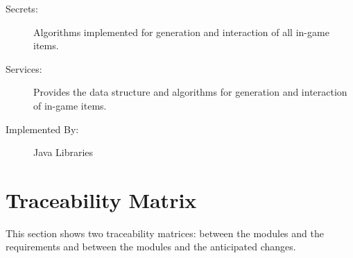 \documentclass[12pt, titlepage]{article}
\begin{document}
\begin{description}
\item[Secrets:]Algorithms implemented for generation and interaction of all in-game items.
\item[Services:]Provides the data structure and algorithms for generation and interaction of in-game items.
\item[Implemented By:] Java Libraries
\end{description}

\section{Traceability Matrix} \label{SecTM}

This section shows two traceability matrices: between the modules and the
requirements and between the modules and the anticipated changes.

\end{document}
